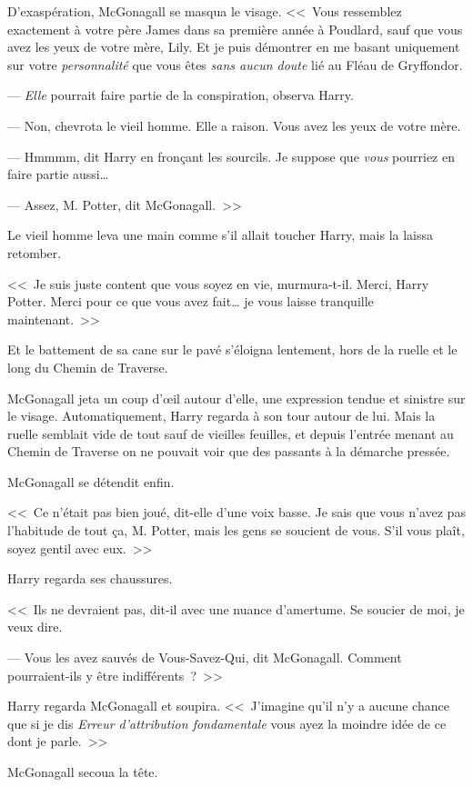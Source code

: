 D'exaspération, McGonagall se masqua le visage.
<<~Vous ressemblez exactement à votre père James dans sa première année à Poudlard, sauf que vous avez les yeux de votre mère, Lily. Et je puis démontrer en me basant uniquement sur votre \emph{personnalité} que vous êtes \emph{sans aucun doute} lié au Fléau de Gryffondor.

--- \emph{Elle} pourrait faire partie de la conspiration, observa Harry.

--- Non, chevrota le vieil homme. Elle a raison. Vous avez les yeux de votre mère.

--- Hmmmm, dit Harry en fronçant les sourcils. Je suppose que \emph{vous} pourriez en faire partie aussi…

--- Assez, M. Potter, dit McGonagall.~>>

Le vieil homme leva une main comme s'il allait toucher Harry, mais la laissa retomber.

<<~Je suis juste content que vous soyez en vie, murmura-t-il. Merci, Harry Potter. Merci pour ce que vous avez fait… je vous laisse tranquille maintenant.~>>

Et le battement de sa cane sur le pavé s'éloigna lentement, hors de la ruelle et le long du Chemin de Traverse.

McGonagall jeta un coup d'œil autour d'elle, une expression tendue et sinistre sur le visage. Automatiquement, Harry regarda à son tour autour de lui. Mais la ruelle semblait vide de tout sauf de vieilles feuilles, et depuis l'entrée menant au Chemin de Traverse on ne pouvait voir que des passants à la démarche pressée.

McGonagall se détendit enfin.

<<~Ce n'était pas bien joué, dit-elle d'une voix basse. Je sais que vous n'avez pas l'habitude de tout ça, M. Potter, mais les gens se soucient de vous. S'il vous plaît, soyez gentil avec eux.~>>

Harry regarda ses chaussures.

<<~Ils ne devraient pas, dit-il avec une nuance d'amertume. Se soucier de moi, je veux dire.

--- Vous les avez sauvés de Vous-Savez-Qui, dit McGonagall. Comment pourraient-ils y être indifférents~?~>>

Harry regarda McGonagall et soupira. <<~J'imagine qu'il n'y a aucune chance que si je dis \emph{Erreur d'attribution fondamentale} vous ayez la moindre idée de ce dont je parle.~>>

McGonagall secoua la tête.


